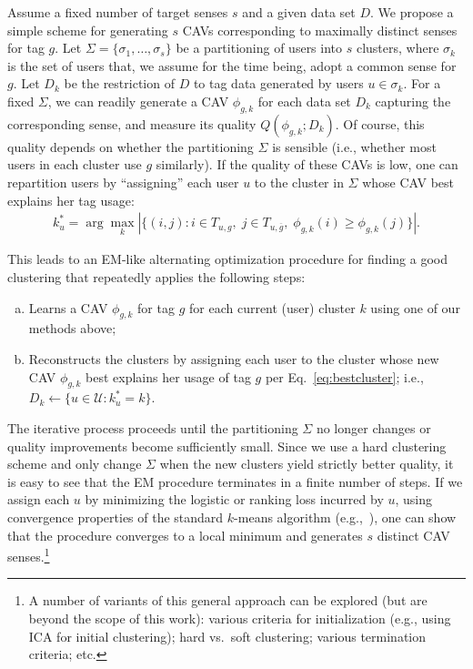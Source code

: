 \documentclass[manuscript,screen,nonacm]{acmart}
\newcommand{\1}{{\mathbf 1}}
\newcommand{\calU}{\mathcal{U}}
\newcommand{\olg}{\overline{g}}
\theoremstyle{TheoremNum}
\begin{document}
Assume a fixed number of target senses $s$ and a given data set $D$. We propose a simple scheme for generating $s$ CAVs corresponding to maximally distinct senses for tag $g$. Let $\Sigma = \{\sigma_1, \ldots, \sigma_s\}$ be a partitioning of users into $s$ clusters, where $\sigma_k$ is the set of users that, we assume for the time being, adopt a common sense for $g$. Let $D_k$ be the restriction of $D$ to tag data generated by users $u\in\sigma_k$. For a fixed $\Sigma$, we can readily generate a CAV $\phi_{g,k}$ for each data set $D_k$ capturing the corresponding sense, and measure its quality $Q(\phi_{g,k};D_k)$. Of course, this quality depends on whether the partitioning $\Sigma$ is sensible (i.e., whether most users in each cluster use $g$ similarly). If the quality of these CAVs is low, one can repartition users by ``assigning'' each user $u$ to the cluster in $\Sigma$ whose CAV best explains her tag usage:
\begin{align}
k^*_u = \arg\max_k |\{(i,j)\! :\! i\!\in\! T_{u,g},\; j\!\in\! T_{u,\olg},\; \phi_{g,k}(i)\! \geq\! \phi_{g,k}(j)\}|.
\label{eq:bestcluster}
\end{align}

This leads to an EM-like alternating optimization procedure \cite{bishop_PRML:2006} for finding a good clustering that repeatedly applies the following steps:
\begin{enumerate}[(a)]
\item Learns a CAV $\phi_{g,k}$ for tag $g$ for each current (user) cluster $k$ using one of our methods above;
\item Reconstructs the clusters by assigning each user to the cluster whose new CAV $\phi_{g,k}$ best explains her usage of tag $g$ per Eq.~\ref{eq:bestcluster}; i.e., $D_k \leftarrow \{u \in\calU : k^*_u = k\}$.
\end{enumerate}
The iterative process proceeds until the partitioning $\Sigma$ no longer changes or quality improvements become sufficiently small.
Since we use a hard clustering scheme and only change $\Sigma$ when the new clusters yield strictly better quality, it is easy to see that the EM procedure terminates in a finite number of steps. If we assign each $u$ by minimizing the logistic or ranking loss incurred by $u$, using convergence properties of the standard $k$-means algorithm (e.g.,~\cite{bottou_kmeans}), one can show that the procedure converges to a local minimum and generates $s$ distinct CAV senses.\footnote{A number of variants of this general approach can be explored (but are beyond the scope of this work): various criteria for initialization (e.g., using ICA for initial clustering); hard vs.\ soft clustering; various termination criteria; etc.}
\end{document}
